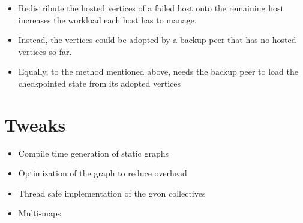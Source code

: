 \begin{itemize}

\item Redistribute the hosted vertices of a failed host onto the
  remaining host increases the workload each host has to manage.
  
\item Instead, the vertices could be adopted by a backup peer
  that has no hosted vertices so far.

\item Equally, to the method mentioned above, needs the backup peer
  to load the checkpointed state from its adopted vertices


\end{itemize}

\section*{Tweaks}
\begin{itemize}
\item Compile time generation of static graphs
\item Optimization of the graph to reduce overhead
\item Thread safe implementation of the gvon collectives
\item Multi-maps  
\end{itemize}

\cleardoublepage

